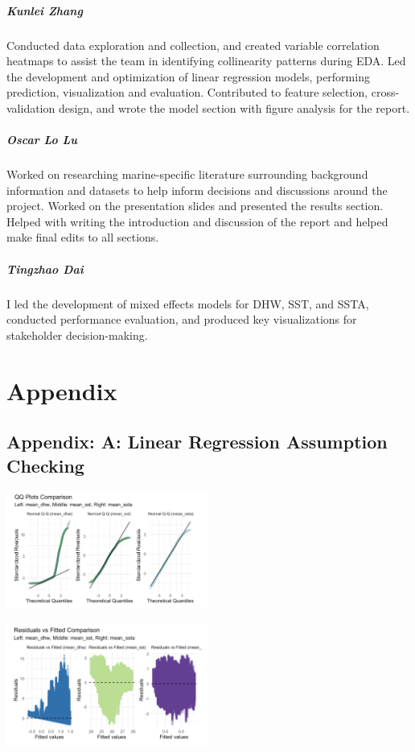 \documentclass[letterpaper,9pt,twocolumn,twoside,]{pinp}
\begin{document}
\subparagraph{Kunlei Zhang}\label{kunlei-zhang}

Conducted data exploration and collection, and created variable
correlation heatmaps to assist the team in identifying collinearity
patterns during EDA. Led the development and optimization of linear
regression models, performing prediction, visualization and evaluation.
Contributed to feature selection, cross-validation design, and wrote the
model section with figure analysis for the report.

\subparagraph{Oscar Lo Lu}\label{oscar-lo-lu}

Worked on researching marine-specific literature surrounding background
information and datasets to help inform decisions and discussions around
the project. Worked on the presentation slides and presented the results
section. Helped with writing the introduction and discussion of the
report and helped make final edits to all sections.

\subparagraph{Tingzhao Dai}\label{tingzhao-dai}

I led the development of mixed effects models for DHW, SST, and SSTA,
conducted performance evaluation, and produced key visualizations for
stakeholder decision-making.

\newpage

\section{Appendix}\label{appendix}

\subsection{Appendix: A: Linear Regression Assumption
Checking}\label{appendix-a-linear-regression-assumption-checking}

\begin{center}
\includegraphics[width=0.5\textwidth]{report_images/lr_qqplots.png}
\end{center}

\begin{center}
\includegraphics[width=0.5\textwidth]{report_images/lr_resplot.png}
\end{center}
\end{document}
